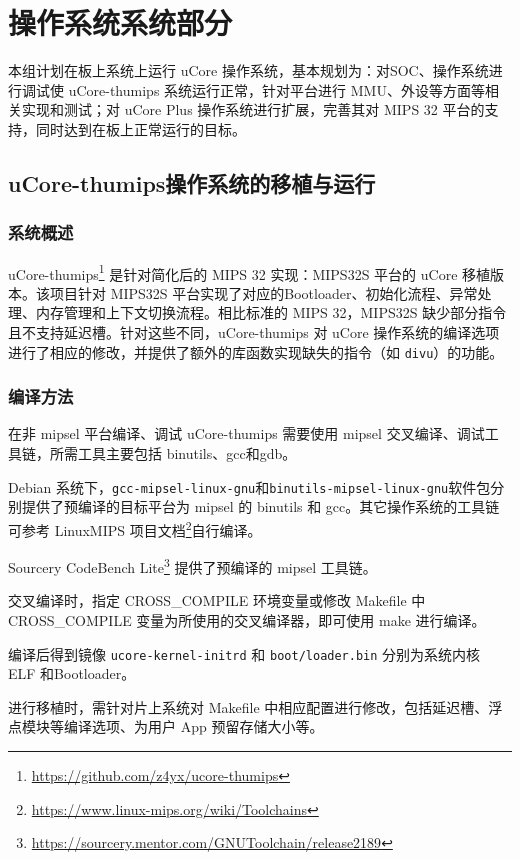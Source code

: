 \chapter{操作系统系统部分}
本组计划在板上系统上运行 uCore 操作系统，基本规划为：对SOC、操作系统进行调试使 uCore-thumips 系统运行正常，针对平台进行 MMU、外设等方面等相关实现和测试；对 uCore Plus 操作系统进行扩展，完善其对 MIPS 32 平台的支持，同时达到在板上正常运行的目标。

\section{uCore-thumips操作系统的移植与运行}
\label{section:ucore-thumips}
\subsection{系统概述}

uCore-thumips\footnote{\url{https://github.com/z4yx/ucore-thumips}} 是针对简化后的 MIPS 32 实现：MIPS32S 平台的 uCore 移植版本。该项目针对 MIPS32S 平台实现了对应的Bootloader、初始化流程、异常处理、内存管理和上下文切换流程。相比标准的 MIPS 32，MIPS32S 缺少部分指令且不支持延迟槽。针对这些不同，uCore-thumips 对 uCore 操作系统的编译选项进行了相应的修改，并提供了额外的库函数实现缺失的指令（如 \texttt{divu}）的功能。

\subsection{编译方法}
在非 mipsel 平台编译、调试 uCore-thumips 需要使用 mipsel 交叉编译、调试工具链，所需工具主要包括 binutils、gcc和gdb。

Debian 系统下，\texttt{gcc-mipsel-linux-gnu}和\texttt{binutils-mipsel-linux-gnu}软件包分别提供了预编译的目标平台为 mipsel 的 binutils 和 gcc。其它操作系统的工具链可参考 LinuxMIPS 项目文档\footnote{\url{https://www.linux-mips.org/wiki/Toolchains}}自行编译。

Sourcery CodeBench Lite\footnote{\url{https://sourcery.mentor.com/GNUToolchain/release2189}} 提供了预编译的 mipsel 工具链。 

交叉编译时，指定 CROSS\_COMPILE 环境变量或修改 Makefile 中 CROSS\_COMPILE 变量为所使用的交叉编译器，即可使用 make 进行编译。

编译后得到镜像 \texttt{ucore-kernel-initrd} 和 \texttt{boot/loader.bin} 分别为系统内核 ELF 和Bootloader。

进行移植时，需针对片上系统对 Makefile 中相应配置进行修改，包括延迟槽、浮点模块等编译选项、为用户 App 预留存储大小等。

